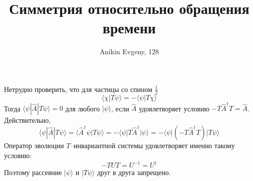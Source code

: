\documentclass{article}
\title{Симметрия относительно обращения времени}
\author{Anikin Evgeny, 128}
\newcommand{\bra}{\langle}
\newcommand{\ket}{\rangle}
\begin{document}
\maketitle
Нетрудно проверить, что для частицы со спином $\frac{1}{2}$
\begin{equation}
    \bra \chi | T\psi \ket = -\bra \psi | T\chi\ket
\end{equation}
Тогда $\bra \psi | \hat{A}  | T\psi \ket = 0$ для любого 
$|\psi \ket$, если
$\hat{A}$ удовлетворяет условию $-T\hat{A}^\dagger T = \hat{A}$.
Действительно,
\begin{equation}
    \bra \psi | \hat{A}  | T\psi \ket = \bra \hat{A}^\dagger \psi | T\psi \ket = 
       -\bra \psi | T \hat{A}^\dagger| \psi \ket = -\bra \psi | (-T\hat{A}^\dagger T) | T\psi \ket
\end{equation}
Оператор эволюции $T$--инвариантной системы удовлетворяет именно такому условию:
\begin{equation}
    -T\hat{U}T = U^{-1} = U^\dagger
\end{equation}
Поэтому рассеяние $|\psi\ket$ и $|T\psi\ket$ друг в друга запрещено.
\end{document}
